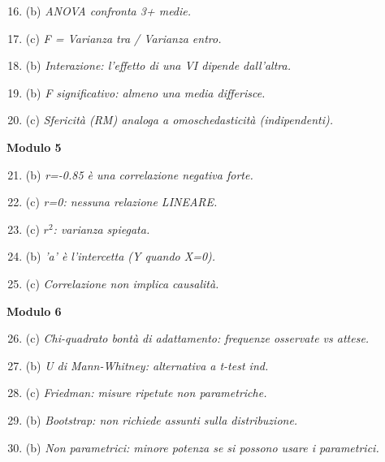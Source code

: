 \documentclass[12pt, a4paper]{article}
\begin{document}
\begin{footnotesize}
\begin{multicols}{2}
\begin{enumerate}
    \setcounter{enumi}{15} %
    \item (b) \textit{ANOVA confronta 3+ medie.}
    \item (c) \textit{F = Varianza tra / Varianza entro.}
    \item (b) \textit{Interazione: l'effetto di una VI dipende dall'altra.}
    \item (b) \textit{F significativo: almeno una media differisce.}
    \item (c) \textit{Sfericità (RM) analoga a omoschedasticità (indipendenti).}
\end{enumerate}
\vspace{0.5cm}
\textbf{Modulo 5}
\begin{enumerate}
    \setcounter{enumi}{20} %
    \item (b) \textit{r=-0.85 è una correlazione negativa forte.}
    \item (c) \textit{r=0: nessuna relazione LINEARE.}
    \item (c) \textit{$r^2$: varianza spiegata.}
    \item (b) \textit{'a' è l'intercetta (Y quando X=0).}
    \item (c) \textit{Correlazione non implica causalità.}
\end{enumerate}
\vspace{0.5cm}
\textbf{Modulo 6}
\begin{enumerate}
    \setcounter{enumi}{25} %
    \item (c) \textit{Chi-quadrato bontà di adattamento: frequenze osservate vs attese.}
    \item (b) \textit{U di Mann-Whitney: alternativa a t-test ind.}
    \item (c) \textit{Friedman: misure ripetute non parametriche.}
    \item (b) \textit{Bootstrap: non richiede assunti sulla distribuzione.}
    \item (b) \textit{Non parametrici: minore potenza se si possono usare i parametrici.}
\end{enumerate}
\end{multicols}
\end{footnotesize}
\end{document}
